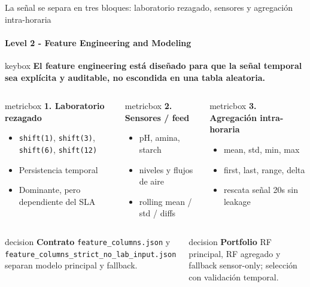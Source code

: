 \documentclass[aspectratio=169,10pt]{beamer}
\newcommand{\keymessage}[1]{%
  \vspace{-0.05cm}
  \begin{beamercolorbox}[wd=\textwidth,sep=0.62em,rounded=true]{keybox}
  \textbf{#1}
  \end{beamercolorbox}\vspace{0.10cm}
}
\newcommand{\decisionbox}[2]{%
  \begin{beamercolorbox}[wd=\textwidth,sep=0.65em,rounded=true]{decision}
  \textbf{\textcolor{MinsurBlue}{#1}}\hspace{0.25em} #2
  \end{beamercolorbox}
}
\begin{document}
\begin{frame}{La señal se separa en tres bloques: laboratorio rezagado, sensores y agregación intra-horaria}
\framesubtitle{Level 2 - Feature Engineering and Modeling}
\keymessage{El feature engineering está diseñado para que la señal temporal sea explícita y auditable, no escondida en una tabla aleatoria.}
\begin{columns}[T]
\begin{beamercolorbox}[wd=\textwidth,sep=0.7em,rounded=true]{metricbox}
\textbf{1. Laboratorio rezagado}
\begin{itemize}\scriptsize
  \item \texttt{shift(1)}, \texttt{shift(3)}, \texttt{shift(6)}, \texttt{shift(12)}
  \item Persistencia temporal
  \item Dominante, pero dependiente del SLA
\end{itemize}
\end{beamercolorbox}
\begin{beamercolorbox}[wd=\textwidth,sep=0.7em,rounded=true]{metricbox}
\textbf{2. Sensores / feed}
\begin{itemize}\scriptsize
  \item pH, amina, starch
  \item niveles y flujos de aire
  \item rolling mean / std / diffs
\end{itemize}
\end{beamercolorbox}
\begin{beamercolorbox}[wd=\textwidth,sep=0.7em,rounded=true]{metricbox}
\textbf{3. Agregación intra-horaria}
\begin{itemize}\scriptsize
  \item mean, std, min, max
  \item first, last, range, delta
  \item rescata señal 20s sin leakage
\end{itemize}
\end{beamercolorbox}
\end{columns}
\vspace{0.25cm}
\begin{columns}[T]
\decisionbox{Contrato}{\texttt{feature\_columns.json} y \texttt{feature\_columns\_strict\_no\_lab\_input.json} separan modelo principal y fallback.}
\decisionbox{Portfolio}{RF principal, RF agregado y fallback sensor-only; selección con validación temporal.}
\end{columns}
\end{frame}
\end{document}
